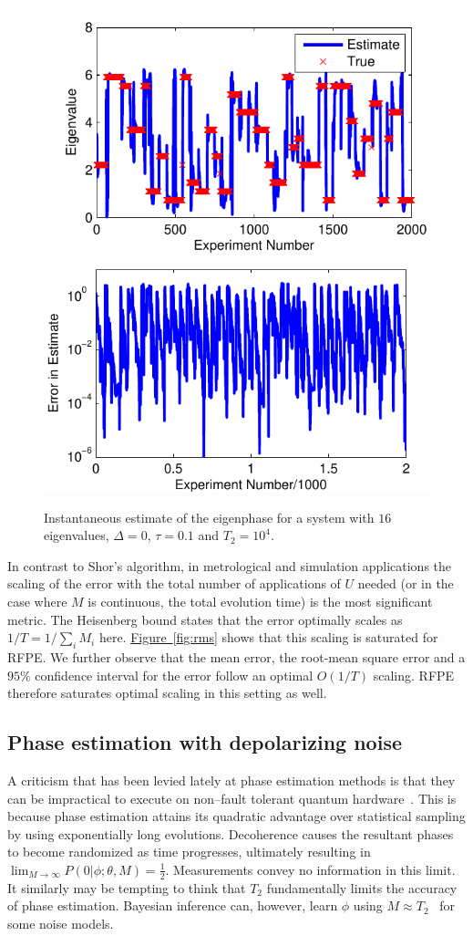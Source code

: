\documentclass[aps,prl,amsmath,twocolumn,amssymb,superscriptaddress]{revtex4-1}
\newcommand{\fig}[1]{\hyperref[fig:#1]{Figure~\ref*{fig:#1}}}
\begin{document}
\begin{figure}
    \begin{centering}
        \includegraphics[width=0.4\linewidth]{Errtrack1.pdf}
        \hspace{5mm}
        \includegraphics[width=0.4\linewidth]{Errtrack2.pdf}
    \end{centering}
    \caption{\label{fig:Errplot}
        Instantaneous estimate of the eigenphase  for a system with $16$ eigenvalues, $\Delta=0$, $\tau=0.1$ and $T_2=10^4$.
    }
\end{figure}

In contrast to Shor's algorithm, in metrological and simulation applications the scaling of the error with the total number of applications of $U$ needed  (or in the case where $M$ is continuous, the total evolution time) is the most significant metric.
The Heisenberg bound states that the error optimally scales as $1/T=1/\sum_i M_i$ here.
\fig{rms} shows that this scaling is saturated for RFPE.  We further observe that the mean error, the
root-mean square error and a $95\%$ confidence interval for the error follow an optimal $O(1/T)$ scaling.
RFPE therefore saturates optimal scaling in this setting as well.




\subsection{Phase estimation with depolarizing noise}
A criticism that has been levied lately at phase estimation methods is that they can be impractical to execute on non--fault tolerant quantum hardware~\cite{PMS+14,MBL+14,WHT15}.  This is because phase estimation attains its quadratic advantage over statistical sampling by using exponentially long evolutions.  Decoherence causes the resultant phases to become randomized as time progresses, ultimately resulting in
$\lim_{M\rightarrow \infty} P(0|\phi;\theta,M) = \frac{1}{2}$.
Measurements convey no information in this limit.  It similarly may be tempting to think that $T_2$ fundamentally limits the accuracy of phase estimation.   Bayesian inference can, however, learn $\phi$ using $M \approx T_2$~\cite{granade_robust_2012} for some noise models.  
\end{document}
